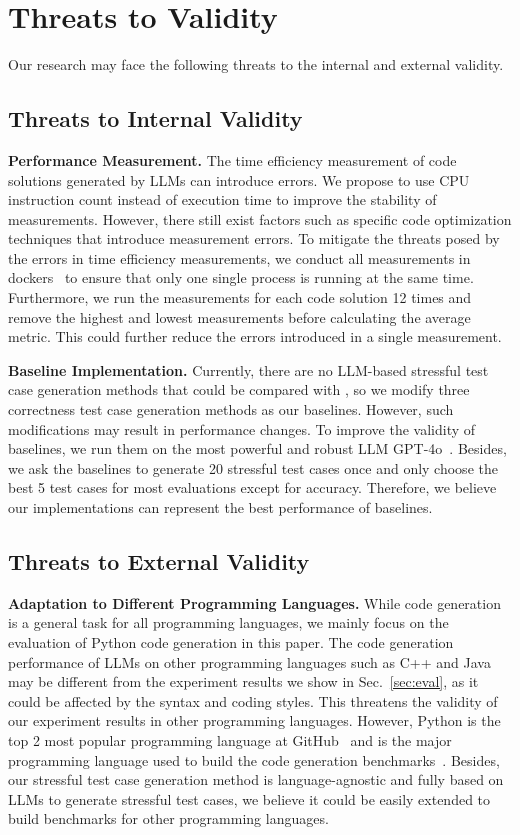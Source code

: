 \section{Threats to Validity}\label{sec:discussion}

Our research may face the following threats to the internal and external validity.


\subsection{Threats to Internal Validity}

\textbf{Performance Measurement.} The time efficiency measurement of code solutions generated by LLMs can introduce errors. We propose to use CPU instruction count instead of execution time to improve the stability of measurements. However, there still exist factors such as specific code optimization techniques that introduce measurement errors. To mitigate the threats posed by the errors in time efficiency measurements, we conduct all measurements in dockers~\cite{docker} to ensure that only one single process is running at the same time. Furthermore, we run the measurements for each code solution 12 times and remove the highest and lowest measurements before calculating the average metric. This could further reduce the errors introduced in a single measurement.

\textbf{Baseline Implementation.} Currently, there are no LLM-based stressful test case generation methods that could be compared with \tool, so we modify three correctness test case generation methods as our baselines. However, such modifications may result in performance changes. To improve the validity of baselines, we run them on the most powerful and robust LLM GPT-4o~\cite{gpt4o}. Besides, we ask the baselines to generate 20 stressful test cases once and only choose the best 5 test cases for most evaluations except for accuracy. Therefore, we believe our implementations can represent the best performance of baselines. 




\subsection{Threats to External Validity}

\textbf{Adaptation to Different Programming Languages.} While code generation is a general task for all programming languages, we mainly focus on the evaluation of Python code generation in this paper. The code generation performance of LLMs on other programming languages such as C++ and Java may be different from the experiment results we show in Sec.~\ref{sec:eval}, as it could be affected by the syntax and coding styles. This threatens the validity of our experiment results in other programming languages. However, Python is the top 2 most popular programming language at GitHub~\cite{octoverse} and is the major programming language used to build the code generation benchmarks~\cite{humaneval,mbpp,codecontests,apps,effibench,hai24repoexec,repobench,repoeval}. Besides, our stressful test case generation method \tool is language-agnostic and fully based on LLMs to generate stressful test cases, we believe it could be easily extended to build benchmarks for other programming languages.